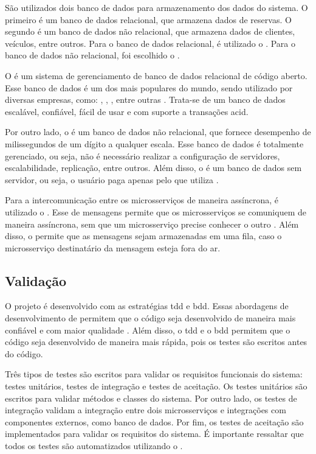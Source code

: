 São utilizados dois banco de dados para armazenamento dos dados do sistema. O primeiro é um banco de dados relacional, que armazena dados de reservas. O segundo é um banco de dados não relacional, que armazena dados de clientes, veículos, entre outros. Para o banco de dados relacional, é utilizado o  \cite{postgreSql}. Para o banco de dados não relacional, foi escolhido o  \cite{dynamoDb}.

O  é um sistema de gerenciamento de banco de dados relacional de código aberto. Esse banco de dados é um dos mais populares do mundo, sendo utilizado por diversas empresas, como: , , , entre outras \cite{postgreSql}. Trata-se de um banco de dados escalável, confiável, fácil de usar e com suporte a transações \acrshort{acid}.

Por outro lado, o  é um banco de dados não relacional, que fornece desempenho de milissegundos de um dígito a qualquer escala. Esse banco de dados é totalmente gerenciado, ou seja, não é necessário realizar a configuração de servidores, escalabilidade, replicação, entre outros. Além disso, o  é um banco de dados sem servidor, ou seja, o usuário paga apenas pelo que utiliza \cite{dynamoDb}.

Para a intercomunicação entre os microsserviços de maneira assíncrona, é utilizado o . Esse  de mensagens permite que os microsserviços se comuniquem de maneira assíncrona, sem que um microsserviço precise conhecer o outro \cite{amazonSqs}. Além disso, o  permite que as mensagens sejam armazenadas em uma fila, caso o microsserviço destinatário da mensagem esteja fora do ar.

\subsection{Validação}
O projeto é desenvolvido com as estratégias \acrfull{tdd} e \acrfull{bdd}. Essas abordagens de desenvolvimento de  permitem que o código seja desenvolvido de maneira mais confiável e com maior qualidade \cite{barauna2020tdd}. Além disso, o \acrshort{tdd} e o \acrshort{bdd} permitem que o código seja desenvolvido de maneira mais rápida, pois os testes são escritos antes do código.

Três tipos de testes são escritos para validar os requisitos funcionais do sistema: testes unitários, testes de integração e testes de aceitação. Os testes unitários são escritos para validar métodos e classes do sistema. Por outro lado, os testes de integração validam a integração entre dois microsserviços e integrações com componentes externos, como banco de dados. Por fim, os testes de aceitação são implementados para validar os requisitos do sistema. É importante ressaltar que todos os testes são automatizados utilizando o  \cite{junit}.

